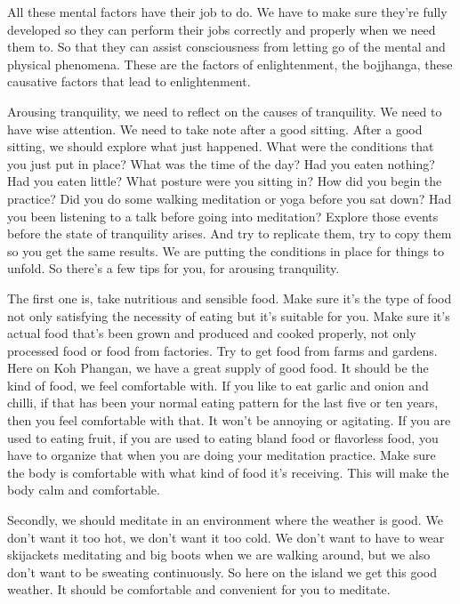 \documentclass[letterpaper,10pt,english]{sphinxmanual}
\begin{document}
\sphinxAtStartPar
All  these  mental  factors  have  their  job  to  do. We  have  to  make  sure
they’re fully developed so they can perform their jobs correctly and properly
when we need them to. So that they can assist consciousness from letting go
of the mental and physical phenomena. These are the factors of enlightenment, the bojjhanga, these causative factors that lead to enlightenment.

\sphinxAtStartPar
Arousing tranquility, we need to reflect on the causes of tranquility. We
need to have wise attention. We need to take note after a good sitting. After
a good sitting, we should explore what just happened. What were the conditions that you just put in place? What was the time of the day? Had you eaten
nothing? Had you eaten little? What posture were you sitting in? How did
you begin the practice? Did you do some walking meditation or yoga before
you sat down? Had you been listening to a talk before going into meditation? Explore those events before the state of tranquility arises. And try to
replicate them, try to copy them so you get the same results. We are putting
the conditions in place for things to unfold. So there’s a few tips for you, for
arousing tranquility.

\sphinxAtStartPar
The first one is, take nutritious and sensible food. Make sure it’s the
type of food not only satisfying the necessity of eating but it’s suitable for
you. Make sure it’s actual food that’s been grown and produced and cooked
properly,  not  only  processed  food  or  food  from  factories.  Try  to  get  food
  from farms and gardens. Here on Koh Phangan, we have a great supply of
good food. It should be the kind of food, we feel comfortable with. If you
like to eat garlic and onion and chilli, if that has been your normal eating
pattern for the last five or ten years, then you feel comfortable with that. It
won’t be annoying or agitating. If you are used to eating fruit, if you are used
to eating bland food or flavorless food, you have to organize that when you
are doing your meditation practice. Make sure the body is comfortable with
what kind of food it’s receiving. This will make the body calm and comfortable.

\sphinxAtStartPar
Secondly,  we  should  meditate  in  an  environment  where  the  weather
is good. We don’t want it too hot, we don’t want it too cold. We don’t want
to have to wear ski\sphinxhyphen{}jackets meditating and big boots when we are walking
around, but we also don’t want to be sweating continuously. So here on the
island we get this good weather. It should be comfortable and convenient for
you to meditate.
\end{document}
